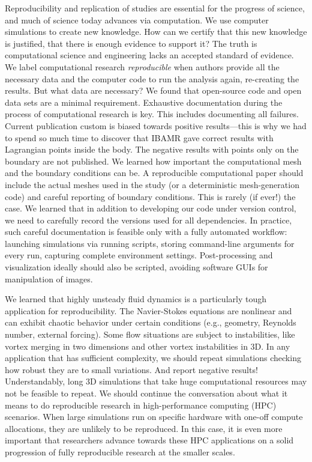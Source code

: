 \documentclass[9pt,twocolumn,twoside]{article}
\newlength{\up}
\begin{document}
Reproducibility and replication of studies are essential for the progress of science, and much of science today advances via computation. 
We use computer simulations to create new knowledge. 
How can we certify that this new knowledge is justified, that there is enough evidence to support it? 
The truth is computational science and engineering lacks an accepted standard of evidence. 
We label computational research \emph{reproducible} when authors provide all the necessary data and the computer code to run the analysis again, re-creating the results. 
But what data are necessary? 
We found that open-source code and open data sets are a minimal requirement. 
Exhaustive documentation during the process of computational research is key. 
This includes documenting all failures. 
Current publication custom is biased towards positive results---this is why we had to spend so much time to discover that IBAMR gave correct results with Lagrangian points inside the body. 
The negative results with points only on the boundary are not published. 
We learned how important the computational mesh and the boundary conditions can be. 
A reproducible computational paper should include the actual meshes used in the study (or a deterministic mesh-generation code) and careful reporting of boundary conditions. 
This is rarely (if ever!) the case. 
We learned that in addition to developing our code under version control, we need to carefully record the versions used for all dependencies. 
In practice, such careful documentation is feasible only with a fully automated workflow: 
launching simulations via running scripts, storing command-line arguments for every run, capturing complete environment settings. 
Post-processing and visualization ideally should also be scripted, avoiding software GUIs for manipulation of images. 

We learned that highly unsteady fluid dynamics is a particularly tough application for reproducibility. 
The Navier-Stokes equations are nonlinear and can exhibit chaotic behavior under certain conditions (e.g., geometry, Reynolds number, external forcing). 
Some flow situations are subject to instabilities, like vortex merging in two dimensions and other vortex instabilities in 3D. 
In any application that has sufficient complexity, we should repeat simulations checking how robust they are to small variations. 
And report negative results! 
Understandably, long 3D simulations that take huge computational resources may not be feasible to repeat. 
We should continue the conversation about what it means to do reproducible research in high-performance computing (HPC) scenarios. 
When large simulations run on specific hardware with one-off compute allocations, they are unlikely to be reproduced. 
In this case, it is even more important that researchers advance towards these HPC applications on a solid progression of fully reproducible research at the smaller scales.
\end{document}
